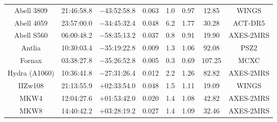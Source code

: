 \begin{table}
\begin{tabular}{cccccccc}
Abell 3809 & 21:46:58.8 & $-$43:52:58.8 & 0.063 & 1.0 & 0.97 & 12.85 & WINGS \\
Abell 4059 & 23:57:00.0 & $-$34:45:32.4 & 0.048 & 6.2 & 1.77 & 30.28 & ACT-DR5 \\
Abell S560 & 06:00:48.2 & $-$58:35:13.2 & 0.037 & 0.8 & 0.91 & 19.90 & AXES-2MRS \\
Antlia & 10:30:03.4 & $-$35:19:22.8 & 0.009 & 1.3 & 1.06 & 92.08 & PSZ2 \\
Fornax & 03:38:27.8 & $-$35:26:52.8 & 0.005 & 0.3 & 0.69 & 107.25 & MCXC \\
Hydra (A1060) & 10:36:41.8 & $-$27:31:26.4 & 0.012 & 2.2 & 1.26 & 82.82 & AXES-2MRS \\
IIZw108 & 21:13:55.9 & $+$02:33:54.0 & 0.048 & 1.5 & 1.11 & 19.09 & WINGS \\
MKW4 & 12:04:27.6 & $+$01:53:42.0 & 0.020 & 1.4 & 1.08 & 42.82 & AXES-2MRS \\
MKW8 & 14:40:42.2 & $+$03:28:19.2 & 0.027 & 1.4 & 1.09 & 32.46 & AXES-2MRS \\
\end{tabular}
\end{table}
